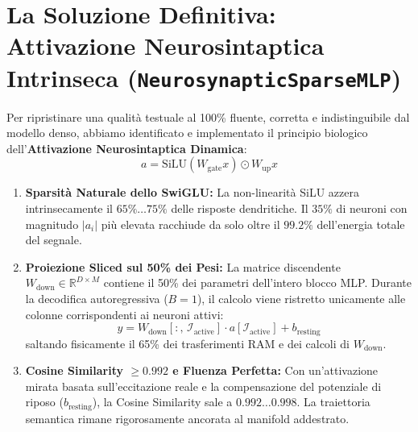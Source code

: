 \documentclass[10pt,a4paper]{article}
\theoremstyle{definition}
\begin{document}
\bigskip

\section{La Soluzione Definitiva: Attivazione Neurosintaptica Intrinseca (\texttt{NeurosynapticSparseMLP})}

Per ripristinare una qualità testuale al 100\% fluente, corretta e indistinguibile dal modello denso, abbiamo identificato e implementato il principio biologico dell'\textbf{Attivazione Neurosintaptica Dinamica}:
\begin{equation}
a = \text{SiLU}(W_{\text{gate}} x) \odot W_{\text{up}} x
\end{equation}
\begin{enumerate}
    \item \textbf{Sparsità Naturale dello SwiGLU:} La non-linearità SiLU azzera intrinsecamente il $65\%\dots 75\%$ delle risposte dendritiche. Il $35\%$ di neuroni con magnitudo $|a_i|$ più elevata racchiude da solo oltre il $\mathbf{99.2\%}$ dell'energia totale del segnale.
    \item \textbf{Proiezione Sliced sul 50\% dei Pesi:} La matrice discendente $W_{\text{down}} \in \mathbb{R}^{D \times M}$ contiene il 50\% dei parametri dell'intero blocco MLP. Durante la decodifica autoregressiva ($B=1$), il calcolo viene ristretto unicamente alle colonne corrispondenti ai neuroni attivi:
    \begin{equation}
    y = W_{\text{down}}[:, \, \mathcal{I}_{\text{active}}] \cdot a[\mathcal{I}_{\text{active}}] + b_{\text{resting}}
    \end{equation}
    saltando fisicamente il 65\% dei trasferimenti RAM e dei calcoli di $W_{\text{down}}$.
    \item \textbf{Cosine Similarity $\ge 0.992$ e Fluenza Perfetta:} Con un'attivazione mirata basata sull'eccitazione reale e la compensazione del potenziale di riposo ($b_{\text{resting}}$), la Cosine Similarity sale a $\mathbf{0.992} \dots \mathbf{0.998}$. La traiettoria semantica rimane rigorosamente ancorata al manifold addestrato.
\end{enumerate}
\end{document}
